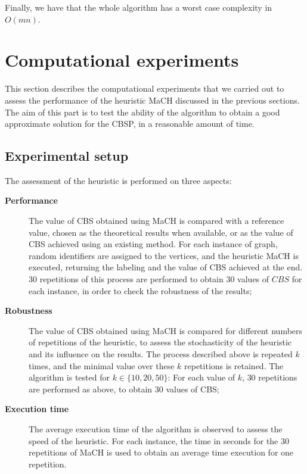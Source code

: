 \documentclass{scrartcl}
\theoremstyle{plain}
\newcommand{\algo}{MaCH}
\newcommand{\cbs}{CBS}
\newcommand{\cbsp}{CBSP}
\begin{document}
Finally, we have that the whole algorithm has a worst case complexity in 
$O(mn)$.
 
\makeatletter{}\section{Computational experiments}
\label{sec:results}

This section describes the computational experiments that we carried out to 
assess the performance of the heuristic \algo{} discussed in the previous 
sections. The aim of this part is to test the ability of the algorithm to obtain 
a good approximate solution for the \cbsp{}, in a reasonable amount of time. 

\subsection{Experimental setup}
\label{subsec:setup}

The assessment of the heuristic is performed on three aspects:

\begin{description}
	\item[\textbf{Performance}] The value of \cbs{} obtained using \algo{} is 
compared with a reference value, chosen as the theoretical results when 
available, or as the value of \cbs{} achieved using an existing method. For 
each 
instance of graph, random identifiers are assigned to the vertices, and the 
heuristic \algo{} is executed, returning the labeling and the value of \cbs{} 
achieved at the end. $30$ repetitions of this process are performed to obtain 
$30$ values of $\cbs{}$ for each instance, in order to check the robustness of 
the results;
	\item[\textbf{Robustness}] The value of \cbs{} obtained using \algo{} is 
compared for different numbers of repetitions of the heuristic, to assess the 
stochasticity of the heuristic and its influence on the results. The process 
described above is repeated $k$ times, and the minimal value over these $k$ 
repetitions is retained. The algorithm is tested for $k \in 
\{10, 20, 50\}$:  For each value of $k$, $30$ repetitions are performed 
as above, to obtain $30$ values of \cbs{};
	\item[\textbf{Execution time}] The average execution time of the algorithm 
is observed to assess the speed of the heuristic. For each instance, the time 
in seconds for the $30$ repetitions of \algo{} is used to obtain an 
average time execution for one repetition.
\end{description}
\end{document}
